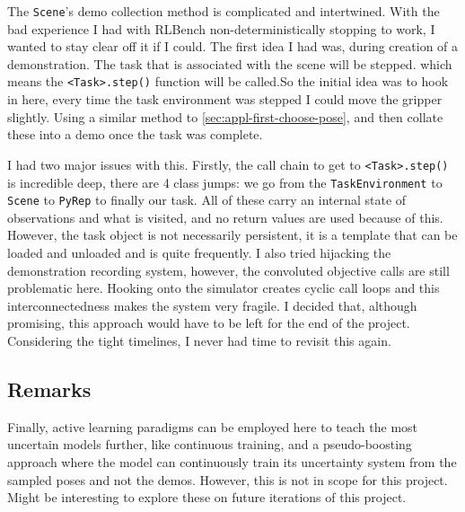 The \verb|Scene|'s demo collection method is complicated and intertwined. With the bad experience I had with RLBench non-deterministically stopping to work, I wanted to stay clear off it if I could. The first idea I had was, during creation of a demonstration. The task that is associated with the scene will be stepped. which means the \verb|<Task>.step()| function will be called.So the initial idea was to hook in here, every time the task environment was stepped I could move the gripper slightly. Using a similar method to \ref{sec:appl-first-choose-pose}, and then collate these into a demo once the task was complete. 

I had two major issues with this. Firstly, the call chain to get to \verb|<Task>.step()| is incredible deep, there are 4 class jumps: we go from the \verb|TaskEnvironment| to \verb|Scene| to \verb|PyRep| to finally our task. All of these carry an internal state of observations and what is visited, and no return values are used because of this. However, the task object is not necessarily persistent, it is a template that can be loaded and unloaded and is quite frequently. 
I also tried hijacking the demonstration recording system, however, the convoluted objective calls are still problematic here. Hooking onto the simulator creates cyclic call loops and this interconnectedness makes the system very fragile. I decided that, although promising, this approach would have to be left for the end of the project. Considering the tight timelines, I never had time to revisit this again.

\subsection{Remarks}
Finally, active learning paradigms can be employed here to teach the most uncertain models further, like continuous training, and a pseudo-boosting approach where the model can continuously train its uncertainty system from the sampled poses and not the demos. However, this is not in scope for this project. Might be interesting to explore these on future iterations of this project.